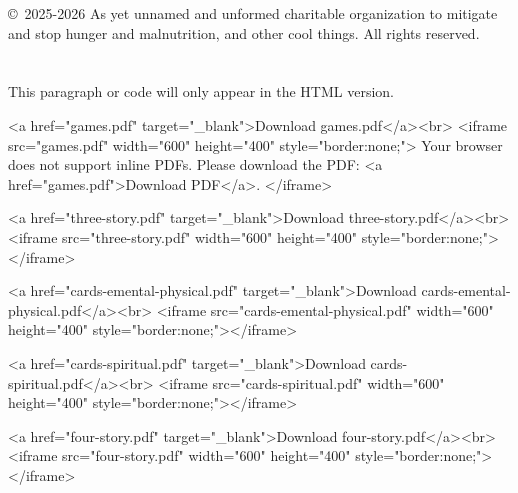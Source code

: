 \documentclass[12pt,letterpaper]{book}
\begin{document}


\copyright\ 2025-2026 As yet unnamed and unformed charitable organization to mitigate and stop hunger and malnutrition, and other cool things. All rights reserved.

\tableofcontents

\chapter{}

\begin{htmlonly}
This paragraph or code will only appear in the HTML version.
\end{htmlonly}






\begin{htmlonly}
\noindent
<a href="games.pdf" target="_blank">Download games.pdf</a><br>
<iframe src="games.pdf" width="600" height="400" style="border:none;">
  Your browser does not support inline PDFs. Please download the PDF: <a href="games.pdf">Download PDF</a>.
</iframe>

<a href="three-story.pdf" target="_blank">Download three-story.pdf</a><br>
<iframe src="three-story.pdf" width="600" height="400" style="border:none;"></iframe>

<a href="cards-emental-physical.pdf" target="_blank">Download cards-emental-physical.pdf</a><br>
<iframe src="cards-emental-physical.pdf" width="600" height="400" style="border:none;"></iframe>

<a href="cards-spiritual.pdf" target="_blank">Download cards-spiritual.pdf</a><br>
<iframe src="cards-spiritual.pdf" width="600" height="400" style="border:none;"></iframe>

<a href="four-story.pdf" target="_blank">Download four-story.pdf</a><br>
<iframe src="four-story.pdf" width="600" height="400" style="border:none;"></iframe>
\end{htmlonly}
\end{document}
